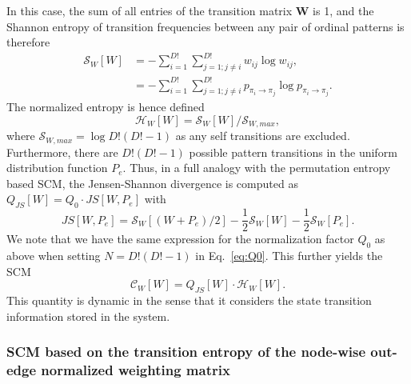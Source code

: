 \documentclass[12pt,aip,cha,reprint,nofootinbib]{revtex4-1}
\begin{document}
In this case, the sum of all entries of the transition matrix $\mathbf{W}$ is 1, and the Shannon entropy of transition frequencies between any pair of ordinal patterns is therefore 
\begin{equation}
\begin{split}
\mathcal{S}_{W}[W] &= - \sum_{i=1}^{D!} \sum_{j = 1; j \neq i}^{D!} w_{ij} \log w_{ij}, \\
& = - \sum_{i=1}^{D!} \sum_{j =1; j \neq i}^{D!} p_{\pi_i \to \pi_j} \log p_{\pi_i \to \pi_j}. 
\end{split}
\end{equation}
The normalized entropy is hence defined 
\begin{equation}
\mathcal{H}_{W}[W] = \mathcal{S}_{W}[W] / \mathcal{S}_{W, max}, 
\end{equation}
where $\mathcal{S}_{W, max} = \log D! (D! - 1)$ as any self transitions are excluded. Furthermore, there are $D! (D! - 1)$ possible pattern transitions in the uniform distribution function $P_e$. Thus, in a full analogy with the permutation entropy based SCM, the Jensen-Shannon divergence is computed as $Q_{JS}[W] = Q_0 \cdot JS[W, P_e]$ with
\begin{equation}
JS [W, P_e] = \mathcal{S}_{W}[(W + P_e)/2] - \frac{1}{2}\mathcal{S}_{W}[W] - \frac{1}{2}\mathcal{S}_{W}[P_e]. 
\end{equation}
We note that we have the same expression for the normalization factor $Q_0$ as above when setting $N = D! (D! - 1)$ in Eq.~\eqref{eq:Q0}. This further yields the SCM 
\begin{equation}
\mathcal{C}_{W}[W] = Q_{JS}[W] \cdot \mathcal{H}_{W}[W].
\end{equation}
This quantity is dynamic in the sense that it considers the state transition information stored in the system. 

\subsubsection{SCM based on the transition entropy of the node-wise out-edge normalized weighting matrix}
\end{document}
